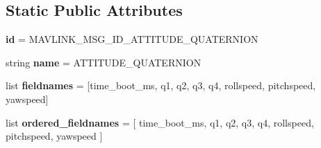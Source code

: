 \subsection*{Static Public Attributes}
\begin{DoxyCompactItemize}
\item 
\mbox{\label{classpymavlink_1_1dialects_1_1v10_1_1MAVLink__attitude__quaternion__message_aa10fa586bd08cfbe819e3dff9bf9f0c3}} 
{\bfseries id} = M\+A\+V\+L\+I\+N\+K\+\_\+\+M\+S\+G\+\_\+\+I\+D\+\_\+\+A\+T\+T\+I\+T\+U\+D\+E\+\_\+\+Q\+U\+A\+T\+E\+R\+N\+I\+ON
\item 
\mbox{\label{classpymavlink_1_1dialects_1_1v10_1_1MAVLink__attitude__quaternion__message_a4f99ea10c3e1c8412b105ae95f5b5ec4}} 
string {\bfseries name} = \textquotesingle{}A\+T\+T\+I\+T\+U\+D\+E\+\_\+\+Q\+U\+A\+T\+E\+R\+N\+I\+ON\textquotesingle{}
\item 
\mbox{\label{classpymavlink_1_1dialects_1_1v10_1_1MAVLink__attitude__quaternion__message_a5a21ee63021ad8889d13e959d40bb174}} 
list {\bfseries fieldnames} = \mbox{[}\textquotesingle{}time\+\_\+boot\+\_\+ms\textquotesingle{}, \textquotesingle{}q1\textquotesingle{}, \textquotesingle{}q2\textquotesingle{}, \textquotesingle{}q3\textquotesingle{}, \textquotesingle{}q4\textquotesingle{}, \textquotesingle{}rollspeed\textquotesingle{}, \textquotesingle{}pitchspeed\textquotesingle{}, \textquotesingle{}yawspeed\textquotesingle{}\mbox{]}
\item 
\mbox{\label{classpymavlink_1_1dialects_1_1v10_1_1MAVLink__attitude__quaternion__message_a981cbe94c5f44a08ee4774b0ecae965d}} 
list {\bfseries ordered\+\_\+fieldnames} = \mbox{[} \textquotesingle{}time\+\_\+boot\+\_\+ms\textquotesingle{}, \textquotesingle{}q1\textquotesingle{}, \textquotesingle{}q2\textquotesingle{}, \textquotesingle{}q3\textquotesingle{}, \textquotesingle{}q4\textquotesingle{}, \textquotesingle{}rollspeed\textquotesingle{}, \textquotesingle{}pitchspeed\textquotesingle{}, \textquotesingle{}yawspeed\textquotesingle{} \mbox{]}
\item 
\mbox{\label{classpymavlink_1_1dialects_1_1v10_1_1MAVLink__attitude__quaternion__message_a7937ba27397ee11b9ce5a3a3408add64}} 

\end{DoxyCompactItemize}
